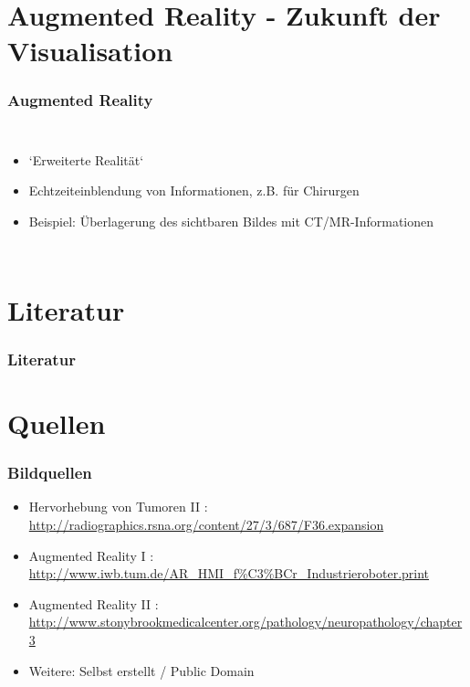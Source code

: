 \documentclass[14pt]{beamer}
\begin{document}
\section{Augmented Reality - Zukunft der Visualisation}
\begin{frame}[allowframebreaks]
\frametitle{Augmented Reality}
\begin{columns}
	    \begin{itemize}
	    \item `Erweiterte Realität`
	    \item Echtzeiteinblendung von Informationen, z.B. für Chirurgen
	    \item Beispiel: Überlagerung des sichtbaren Bildes mit CT/MR-Informationen
	    \end{itemize}
\end{columns}

\end{frame}
%
%
%
\section{Literatur}
\begin{frame}[allowframebreaks]
\frametitle{Literatur}


\nocite{*}
\end{frame}
%
%
%
\section{Quellen}
\begin{frame}[shrink]
 \frametitle{Bildquellen}
 \begin{itemize}
  \item Hervorhebung von Tumoren II :\\ \url{http://radiographics.rsna.org/content/27/3/687/F36.expansion}
  \item Augmented Reality I :\\ \url{http://www.iwb.tum.de/AR_HMI_f\%C3\%BCr_Industrieroboter.print}
  \item Augmented Reality II :\\ \url{http://www.stonybrookmedicalcenter.org/pathology/neuropathology/chapter3}
  \item Weitere: Selbst erstellt / Public Domain
 \end{itemize}
 
\end{frame}
\end{document}
